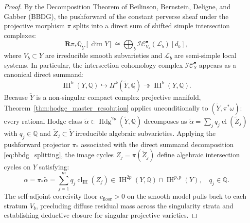 \documentclass[11pt,a4paper]{article}
\theoremstyle{definition}
\theoremstyle{plain}
\DeclareMathOperator{\Hdg}{Hdg}
\DeclareMathOperator{\cl}{cl}
\begin{document}
\begin{proof}
By the Decomposition Theorem of Beilinson, Bernstein, Deligne, and Gabber (BBDG)\cite{bbdg_1982}, the pushforward of the constant perverse sheaf under the projective morphism $\pi$ splits into a direct sum of shifted simple intersection complexes:
\begin{equation}
    \label{eq:bbdg_splitting}
    \mathbf{R}\pi_* \mathbb{Q}_{\widetilde{Y}}[\dim Y] \cong \bigoplus_{b} \mathcal{IC}_{V_b}^\bullet(\mathcal{L}_b)[d_b],
\end{equation}
where $V_b \subset Y$ are irreducible smooth subvarieties and $\mathcal{L}_b$ are semi-simple local systems. In particular, the intersection cohomology complex $\mathcal{IC}_Y^\bullet$ appears as a canonical direct summand:
\begin{equation}
    \operatorname{IH}^k(Y, \mathbb{Q}) \hookrightarrow H^k(\widetilde{Y}, \mathbb{Q}) \twoheadrightarrow \operatorname{IH}^k(Y, \mathbb{Q}).
\end{equation}
Because $\widetilde{Y}$ is a non-singular compact complex projective manifold, Theorem~\ref{thm:hodge_master_resolution} applies unconditionally to $(\widetilde{Y}, \pi^* \omega)$: every rational Hodge class $\widetilde{\alpha} \in \Hdg^{2p}(\widetilde{Y}, \mathbb{Q})$ decomposes as $\widetilde{\alpha} = \sum_{j} q_j \cl(\widetilde{Z}_j)$ with $q_j \in \mathbb{Q}$ and $\widetilde{Z}_j \subset \widetilde{Y}$ irreducible algebraic subvarieties. Applying the pushforward projector $\pi_*$ associated with the direct summand decomposition \eqref{eq:bbdg_splitting}, the image cycles $Z_j = \pi(\widetilde{Z}_j)$ define algebraic intersection cycles on $Y$ satisfying:
\begin{equation}
    \alpha = \pi_* \widetilde{\alpha} = \sum_{j=1}^m q_j \cl_{\operatorname{IH}}(Z_j) \in \operatorname{IH}^{2p}(Y, \mathbb{Q}) \cap \operatorname{IH}^{p,p}(Y), \quad q_j \in \mathbb{Q}.
\end{equation}
The self-adjoint coercivity floor $c_{\mathrm{floor}} > 0$ on the smooth model pulls back to each stratum $V_b$, precluding diffuse residual mass across the singularity strata and establishing deductive closure for singular projective varieties.
\end{proof}
\end{document}
